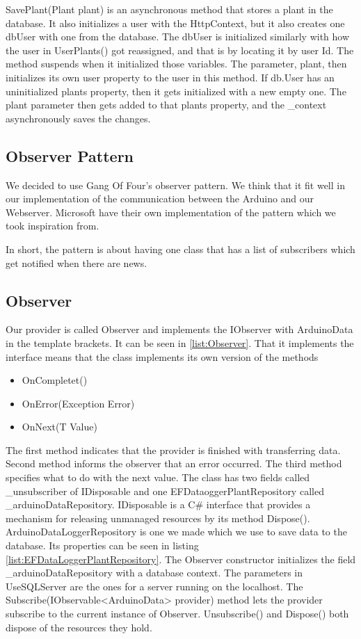 \documentclass[a4paper,12pt,oneside,openright,titlepage]{book}
\begin{document}
SavePlant(Plant plant) is an asynchronous method that stores a plant in the database.  It also initializes a user with the HttpContext, but it also creates one dbUser with one from the database. The dbUser is initialized similarly with how the user in UserPlants() got reassigned, and that is by locating it by user Id. The method suspends when it initialized those variables. The parameter, plant, then initializes its own user property to the user in this method. If db.User has an uninitialized plants property, then it gets initialized with a new empty one. The plant parameter then gets added to that plants property, and the \_context asynchronously saves the changes.
  
\subsection{Observer Pattern}
We decided to use Gang Of Four's observer pattern\cite{GoF}. We think that it fit well in our implementation of the communication between the Arduino and our Webserver. Microsoft have their own implementation of the pattern\cite{MicrosoftObserver} which we took inspiration from.
 
In short, the pattern is about having one class that has a list of subscribers which get notified when there are news.

\subsection{Observer}
Our provider is called Observer and implements the IObserver with ArduinoData in the template brackets. It can be seen in \ref{list:Observer}. That it implements the interface means that the class implements its own version of the methods
\begin{itemize}
\item OnCompletet()
\item OnError(Exception Error)
\item OnNext(T Value)
\end{itemize}

The first method indicates that the provider is finished with transferring data. Second method informs the observer that an error occurred. The third method specifies what to do with the next value.
The class has two fields called \_unsubscriber of IDisposable and one EFDataoggerPlantRepository called \_arduinoDataRepository. IDisposable is a C\# interface that provides a mechanism for releasing unmanaged resources by its method Dispose(). ArduinoDataLoggerRepository is one we made which we use to save data to the database. Its properties can be seen in listing \ref{list:EFDataLoggerPlantRepository}. The Observer constructor initializes the field \_arduinoDataRepository with a database context. The parameters in UseSQLServer are the ones for a server running on the localhost. The Subscribe(IObservable<ArduinoData> provider) method lets the provider subscribe to the current instance of Observer. Unsubscribe() and Dispose() both dispose of the resources they hold. 
\end{document}
